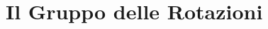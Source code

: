 \documentclass[11pt]{report}
\theoremstyle{plain}
\theoremstyle{definition}
\theoremstyle{remark}
\begin{document}
%	




\clearpage
\chapter{Il Gruppo delle Rotazioni}
\end{document}
